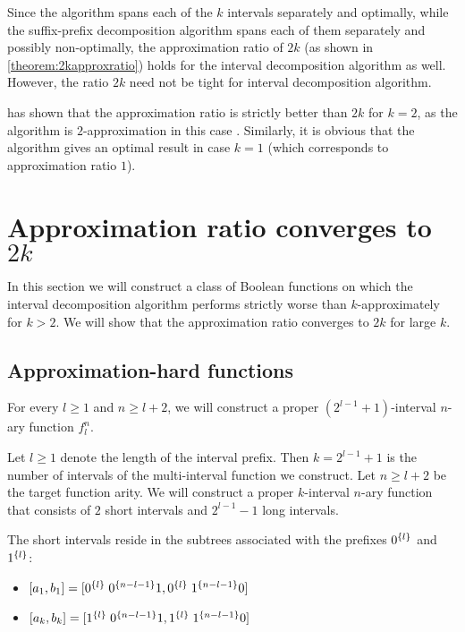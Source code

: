 Since the algorithm
spans each of the $k$ intervals separately and optimally,
while the suffix-prefix decomposition algorithm
spans each of them separately and possibly non-optimally,
the approximation ratio of $2k$
(as shown in \autoref{theorem:2kapproxratio})
holds for the interval decomposition algorithm as well.
However,
the ratio $2k$ need not be tight
for interval decomposition algorithm.

\citeauthor{Dubovsky2012} has shown
that the approximation ratio is strictly better than $2k$
for $k = 2$,
as the algorithm is $2$-approximation
in this case \citep[p.~39]{Dubovsky2012}. %
Similarly,
it is obvious that the algorithm
gives an optimal result in case $k = 1$
(which corresponds to approximation ratio $1$).

\section{Approximation ratio converges
to \texorpdfstring{$2k$}{2k}}

In this section
we will construct a class of Boolean functions
on which the interval decomposition algorithm
performs strictly worse than $k$-approximately
for $k > 2$.
We will show that the approximation ratio converges to $2k$
for large $k$.

\subsection{Approximation-hard functions}

For every $l \geq 1$ and $n \geq l+2$,
we will construct
a proper $(2^{l-1} + 1)$-interval $n$-ary function $f_l^n$.

Let $l \geq 1$
denote the length of the interval prefix.
Then $k = 2^{l-1} + 1$
is the number of intervals
of the multi-interval function we construct.
Let $n \geq l+2$ be the target function arity.
We will construct
a proper $k$-interval $n$-ary function
that consists of $2$ short intervals and $2^{l-1} - 1$
long intervals.

The short intervals reside in the subtrees associated
with the prefixes $0^{\{l\}}$ and $1^{\{l\}}$:

\begin{itemize}
\item
$[a_1, b_1] =
[0^{\{l\}} \; 0^{\{n-l-1\}} 1, 0^{\{l\}} \; 1^{\{n-l-1\}} 0]$
\item
$[a_k, b_k] =
[1^{\{l\}} \; 0^{\{n-l-1\}} 1, 1^{\{l\}} \; 1^{\{n-l-1\}} 0]$
\end{itemize}


